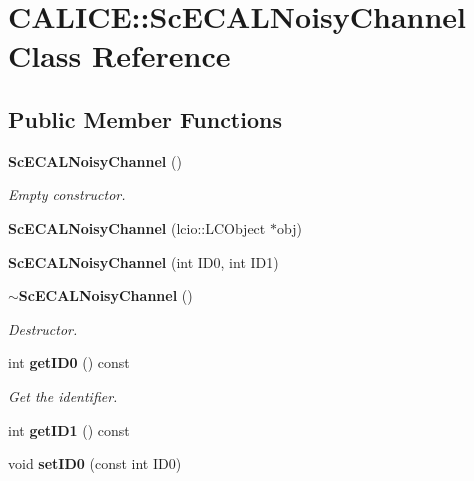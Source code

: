 \section{CALICE::ScECALNoisyChannel Class Reference}
\label{classCALICE_1_1ScECALNoisyChannel}
\subsection*{Public Member Functions}
\begin{DoxyCompactItemize}
\item 
{\bf ScECALNoisyChannel} ()\label{classCALICE_1_1ScECALNoisyChannel_abba990d4e99f022acc1910aa8276d8d6}

\begin{DoxyCompactList}\small\item\em Empty constructor. \item\end{DoxyCompactList}\item 
{\bfseries ScECALNoisyChannel} (lcio::LCObject $\ast$obj)\label{classCALICE_1_1ScECALNoisyChannel_a94ae8188eeeca1052e878ea283914ed3}

\item 
{\bfseries ScECALNoisyChannel} (int ID0, int ID1)\label{classCALICE_1_1ScECALNoisyChannel_ad10e6bb09bce1af54f2add75ba44f4a3}

\item 
{\bf $\sim$ScECALNoisyChannel} ()\label{classCALICE_1_1ScECALNoisyChannel_af8abb5fcb758acef14175159eecbb276}

\begin{DoxyCompactList}\small\item\em Destructor. \item\end{DoxyCompactList}\item 
int {\bf getID0} () const \label{classCALICE_1_1ScECALNoisyChannel_af47f3ccdb2a1398ef12a1559d51a0d22}

\begin{DoxyCompactList}\small\item\em Get the identifier. \item\end{DoxyCompactList}\item 
int {\bfseries getID1} () const \label{classCALICE_1_1ScECALNoisyChannel_a9e873106d13a24f9ec75a4fd23696936}

\item 
void {\bf setID0} (const int ID0)\label{classCALICE_1_1ScECALNoisyChannel_ab72626dde01d6a27902d2899cbd7e38b}


\end{DoxyCompactItemize}
